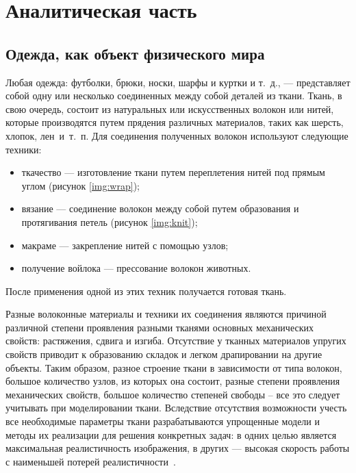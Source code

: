\chapter{Аналитическая часть}

\section{Одежда, как объект физического мира}

Любая одежда: футболки, брюки, носки, шарфы и куртки и т.~д., --- представляет
собой одну или несколько соединенных между собой деталей из ткани. Ткань, в свою
очередь, состоит из натуральных или искусственных волокон или нитей, которые
производятся путем прядения различных материалов, таких как шерсть, хлопок,
лен~и~т.~п. Для соединения полученных волокон используют следующие техники:
\begin{itemize}[left=\parindent]
    \item ткачество --- изготовление ткани путем переплетения нитей под прямым
        углом (рисунок \ref{img:wrap});
    \item вязание --- соединение волокон между собой путем образования и
        протягивания петель (рисунок \ref{img:knit});
    \item макраме --- закрепление нитей с помощью узлов;
    \item получение войлока --- прессование волокон животных.
\end{itemize}
После применения одной из этих техник получается готовая ткань.


Разные волоконные материалы и техники их соединения являются причиной различной
степени проявления разными тканями основных механических свойств: растяжения,
сдвига и изгиба. Отсутствие у тканных материалов упругих свойств приводит к
образованию складок и легком драпировании на другие объекты. Таким образом,
разное строение ткани в зависимости от типа волокон, большое количество узлов,
из которых она состоит, разные степени проявления механических свойств, большое
количество степеней свободы -- все это следует учитывать при моделировании
ткани. Вследствие отсутствия возможности учесть все необходимые параметры ткани
разрабатываются упрощенные модели и методы их реализации для решения конкретных
задач: в одних целью является максимальная реалистичность изображения, в других
--- высокая скорость работы с наименьшей потерей реалистичности~\cite{bib11}.

